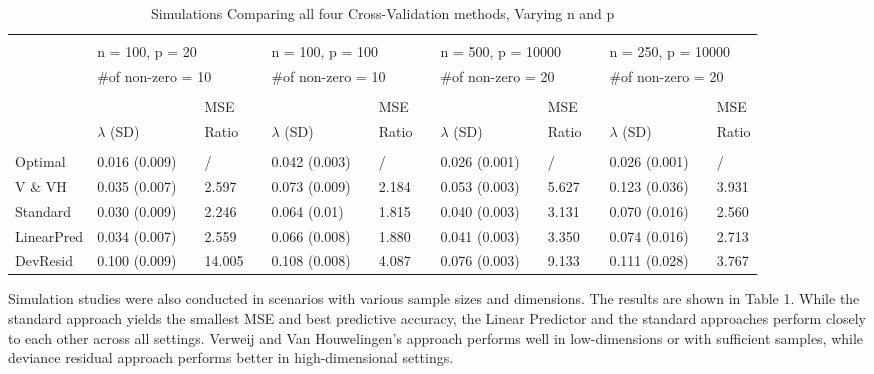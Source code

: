 \begin{table}[h]
\small
\centering
\caption{Simulations Comparing all four Cross-Validation methods, Varying n and p}
\begin{tabular}{llllllllllllllll}
\hline\\[-0.75em]
       & \multicolumn{3}{l}{n = 100, p = 20} &  & \multicolumn{3}{l}{n = 100, p = 100} &  & \multicolumn{3}{l}{n = 500, p = 10000} &  & \multicolumn{3}{l}{n = 250, p = 10000} \\
       & \multicolumn{3}{l}{$\#$of non-zero = 10} &  & \multicolumn{3}{l}{$\#$of non-zero = 10} &  & \multicolumn{3}{l}{$\#$of non-zero = 20} &  & \multicolumn{3}{l}{$\#$of non-zero = 20} \\ \cline{2-4} \cline{6-8} \cline{10-12} \cline{14-16} 
\hline\\[-0.75em]
       &     &        &MSE       &  &   &       & MSE     &    &    &        & MSE      &  &     &        & MSE      \\
       & $\lambda$ (SD)     & &Ratio       &  & 	$\lambda$ (SD)         & & Ratio     & &	$\lambda$ (SD)         & & Ratio      & &	 $\lambda$ (SD)         & & Ratio      
\\ 
\cline{2-2} \cline{4-4} \cline{6-6} \cline{8-8} \cline{10-10} \cline{12-12} \cline{14-14} \cline{16-16} 
\\[-0.75em]
Optimal &0.016 (0.009)&&/&&0.042 (0.003)&&/&&0.026 (0.001)&&/&&0.026 (0.001)&&/\\          
V $\&$ VH &0.035 (0.007)&&2.597&&0.073 (0.009)&&2.184&&0.053 (0.003)&&5.627&&0.123 (0.036)&&3.931\\
Standard &0.030 (0.009)&&2.246&&0.064 (0.01)&&1.815&&0.040 (0.003)&&3.131&&0.070 (0.016)&&2.560\\
LinearPred &0.034 (0.007)&&2.559&&0.066 (0.008)&&1.880&&0.041 (0.003)&&3.350&&0.074 (0.016)&&2.713\\
DevResid &0.100 (0.009)&&14.005&&0.108 (0.008)&&4.087&&0.076 (0.003)&&9.133&&0.111 (0.028)&&3.767\\ 
\hline
\end{tabular}
\end{table}

\par Simulation studies were also conducted in scenarios with various sample sizes and dimensions. The results are shown in Table 1. While the standard approach yields the smallest MSE and best predictive accuracy, the Linear Predictor and the standard approaches perform closely to each other across all settings. Verweij and Van Houwelingen's approach performs well in low-dimensions or with sufficient samples, while deviance residual approach performs better in high-dimensional settings.

